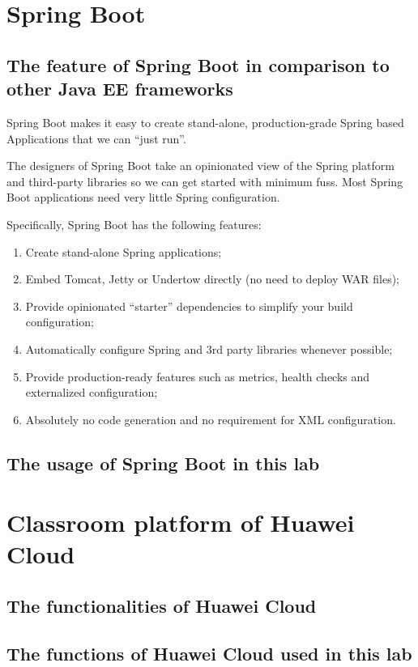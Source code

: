 \documentclass[a4paper]{report}
\begin{document}
\section{Spring Boot}
\subsection{The feature of Spring Boot in comparison to other Java EE frameworks}
Spring Boot makes it easy to create stand-alone, production-grade Spring based Applications that we can ``just run''.
\par
The designers of Spring Boot take an opinionated view of the Spring platform and third-party libraries so we can get started with minimum fuss. Most Spring Boot applications need very little Spring configuration.
\par
Specifically, Spring Boot has the following features:
\begin{enumerate}
  \item Create stand-alone Spring applications;
  \item Embed Tomcat, Jetty or Undertow directly (no need to deploy WAR files);
  \item Provide opinionated ``starter'' dependencies to simplify your build configuration;
  \item Automatically configure Spring and 3rd party libraries whenever possible;
  \item Provide production-ready features such as metrics, health checks and externalized configuration;
  \item Absolutely no code generation and no requirement for XML configuration.
\end{enumerate}
\subsection{The usage of Spring Boot in this lab}

\section{Classroom platform of Huawei Cloud}
\subsection{The functionalities of Huawei Cloud}
\subsection{The functions of Huawei Cloud used in this lab}
\end{document}

